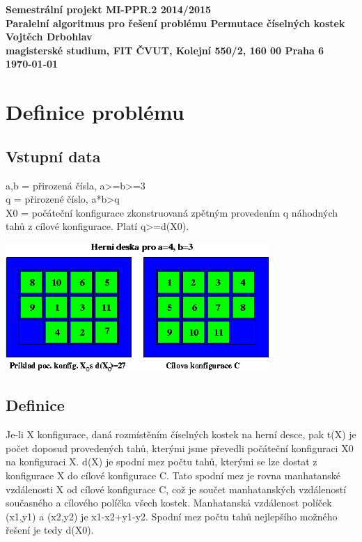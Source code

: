 \documentclass[12pt]{article}
\begin{document}

\begin{center}
\bf Semestrální projekt MI-PPR.2 2014/2015\\[5mm]
    Paralelní algoritmus pro řešení problému Permutace číselných kostek\\[5mm]
       Vojtěch Drbohlav\\[2mm]
magisterské studium, FIT ČVUT, Kolejní 550/2, 160 00 Praha 6\\[2mm]
\today
\end{center}

\section{Definice problému}

\subsection{Vstupní data}

a,b = přirozená čísla, a\textgreater=b\textgreater=3\\
q = přirozené číslo, a*b{\textgreater}q\\
X0 = počáteční konfigurace zkonstruovaná zpětným provedením q náhodných tahů z cílové konfigurace. Platí q\textgreater=d(X0). 

\begin{center}
\includegraphics[width=10cm]{pec}
\end{center}

\subsection{Definice}

Je-li X konfigurace, daná rozmístěním číselných kostek na herní desce, pak
t(X) je počet doposud provedených tahů, kterými jsme převedli počáteční konfiguraci X0 na konfiguraci X.
d(X) je spodní mez počtu tahů, kterými se lze dostat z konfigurace X do cílové konfigurace C. Tato spodní mez je rovna manhatanské vzdálenosti X od cílové konfigurace C, což je součet manhatanských vzdáleností současného a cílového políčka všech kostek. Manhatanská vzdálenost políček (x1,y1) a (x2,y2) je {\textbar}x1-x2{\textbar}+{\textbar}y1-y2{\textbar}. Spodní mez počtu tahů nejlepšího možného řešení je tedy d(X0).
\end{document}
